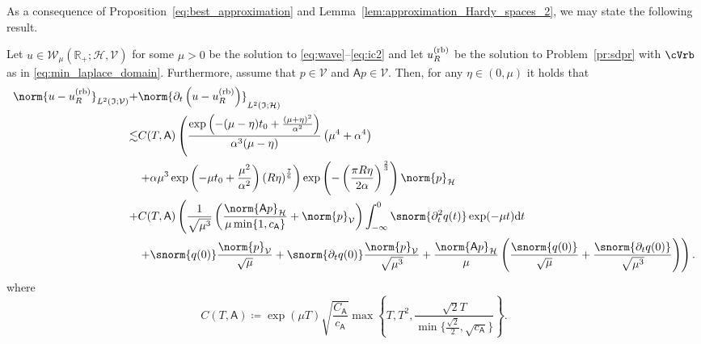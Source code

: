 As a consequence of Proposition~\ref{eq:best_approximation} and 
Lemma~\ref{lem:approximation_Hardy_spaces_2}, we may state the following result. 

\begin{theorem}\label{thm:approximation_Hardy_spaces_3}
Let $u \in \mathcal{W}_\mu(\mathbb{R}_+;\mathcal{H},\mathcal{V})$ for some $\mu>0$ be the solution to \eqref{eq:wave}--\eqref{eq:ic2} 
and let $u^{\normalfont\text{(rb)}}_R$ be the solution to Problem~\ref{pr:sdpr}
with $\cVrb$ as in \eqref{eq:min_laplace_domain}.
Furthermore, assume that $p \in \mathcal{V}$ and 
$\mathsf{A} p \in \mathcal{V}$. 
Then, for any $\eta \in (0,\mu)$ it holds that
\begin{equation}
\begin{aligned}
	\norm{
		u
		-
		u^{\normalfont\text{(rb)}}_R
	}_{L^2(\mathfrak{I};\mathcal{V})}
    +
    &
	\norm{
		\partial_t 
		\left(
			u
			-
			u^{\normalfont\text{(rb)}}_R
		\right)
	}_{L^2(\mathfrak{I};\mathcal{H})}
	\\
    \lesssim
    &
    C(T,\mathsf{A})
    \left(
    \frac{\exp\left(-(\mu-\eta) t_0+\frac{(\mu+\eta)^2}{\alpha^2}\right)}{\alpha^3(\mu-\eta)}
    \left(
		\mu^4
		+
		\alpha^4
    \right)
        \right.
        \\
        &
        \left.
        +
		\alpha \mu^3
    		\exp\left(-\mu t_0 +\frac{\mu^2}{\alpha^2}\right)
		\left( R \eta\right)^\frac{7}{6}
    \right)
	\exp
	\left(
		-\left(\frac{\pi R \eta}{2\alpha} \right)^{\frac{2}{3}}
	\right)
	 \norm{p}_\mathcal{H}
	\\
	+
	&
	C(T,\mathsf{A})
	\left(
    \frac{1}{\sqrt{\mu^3}}
    \left(
    \frac{
        \norm{\mathsf{A}p}_{\mathcal{H}}
        }{
        \mu  \min\{1, c_{\mathsf{A}}\}
        }
        +
        \norm{p}_\mathcal{V}
    \right)
	\int_{-\infty}^{0}
	\snorm{\partial^2_t  q (t)}
	\exp(-\mu t)
	\normalfont\text{d} t
	\right.
	\\
	&
	\left.
	+
	\snorm{q(0)}
	\frac{\norm{p}_{\mathcal{V}}}{\sqrt{\mu}}
	+
	\snorm{\partial_t q(0)}
	\frac{\norm{p}_{\mathcal{V}}}{\sqrt{\mu^3}}
	+
	\frac{
        \norm{\mathsf{A}p}_{\mathcal{H}}
	}{
		\mu
	}
	\left(
		\frac{\snorm{q(0)}}{\sqrt{\mu}}
		+
		\frac{\snorm{\partial_t q(0)}}{\sqrt{\mu^3}}
	\right)
	\right).
\end{aligned}
\end{equation}
where
\begin{equation}\label{eq:constant_C_T_A}
	C(T,\mathsf{A})
	\coloneqq
	\exp(\mu T)
    \sqrt{\frac{C_\mathsf{A}}{c_\mathsf{A}}}
    \max
    \left\{
        T,T^2,\frac{\sqrt{2}T}{\min\{\frac{\sqrt{2}}{2} ,\sqrt{ c_{\mathsf{A}}}\}}
    \right\}.
\end{equation}
\end{theorem}

